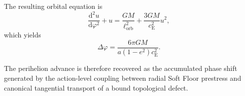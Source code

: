 The resulting orbital equation is
\begin{equation}
    \frac{\mathrm{d}^2u}{\mathrm{d}\varphi^2} + u = \frac{GM}{\ell_{\mathrm{orb}}^2} + \frac{3GM}{c_{\mathrm{E}}^2}u^2,
\end{equation}
which yields
\begin{equation}
    \boxed{ \Delta\varphi = \frac{ 6\pi GM }{ a(1-e^2)c_{\mathrm{E}}^2 } }.
\end{equation}

The perihelion advance is therefore recovered as the accumulated phase shift generated by the action-level coupling between radial Soft Floor prestress and canonical tangential transport of a bound topological defect.
